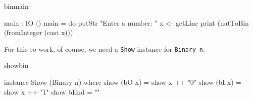 \begin{SaveVerbatim}{binmain}

main : IO ()
main = do putStr "Enter a number: "
          x <- getLine
          print (natToBin (fromInteger (cast x)))

\end{SaveVerbatim}

\noindent
For this to work, of course, we need a \texttt{Show} instance for \texttt{Binary n}:

\begin{SaveVerbatim}{showbin}

instance Show (Binary n) where
    show (bO x) = show x ++ "0"
    show (bI x) = show x ++ "1"
    show bEnd = ""

\end{SaveVerbatim}

